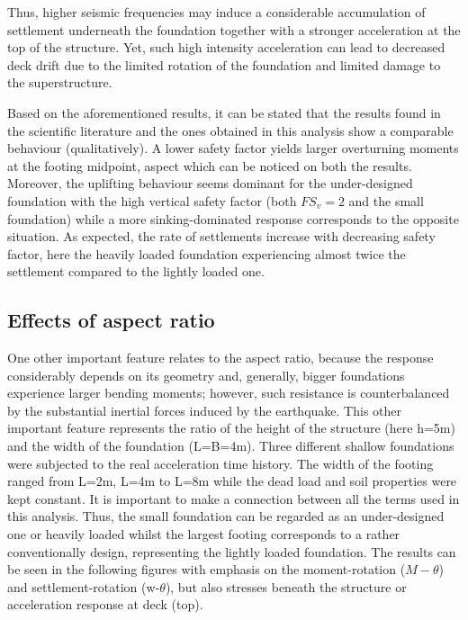  Thus, higher seismic frequencies may induce a considerable accumulation of settlement \mbox{underneath} the foundation together with a stronger acceleration at the top of the structure. Yet, such high intensity acceleration can lead to decreased deck drift due to the limited rotation of the foundation and limited damage to the superstructure.
 
 
 Based on the aforementioned results, it can be stated that the results found in the scientific literature and the ones obtained in this analysis show a comparable behaviour (qualitatively). A lower safety factor yields larger overturning moments at the footing midpoint, aspect which can be noticed on both the results. Moreover, the uplifting behaviour seems dominant for the under-designed foundation with the high vertical safety factor (both $FS_v=2$ and the small foundation) while a more sinking-dominated response corresponds to the opposite situation. As expected, the rate of settlements increase with decreasing safety factor, here the heavily loaded foundation experiencing almost twice the settlement compared to the lightly loaded one.
 
\newpage
\subsection{Effects of aspect ratio}
One other important feature relates to the aspect ratio, because the response considerably depends on its geometry and, generally, bigger foundations experience larger bending moments; however, such resistance is counterbalanced by the substantial inertial forces induced by the earthquake.  This other important feature represents the ratio of the height of the structure (here h=5m) and the width of the foundation (L=B=4m). Three different shallow foundations were subjected to the real acceleration time history. The width of the footing ranged from L=2m, L=4m to L=8m while the dead load and soil properties were kept constant. It is important to make a connection between all the terms used in this analysis. Thus, the small foundation can be regarded as an under-designed one or heavily loaded whilst the largest footing corresponds to a rather conventionally design, representing the lightly loaded foundation. The results can be seen in the following figures with emphasis on the moment-rotation ($M-\theta$) and settlement-rotation (\gls{w}-$\theta$), but also stresses beneath the structure or acceleration response at deck (top).


